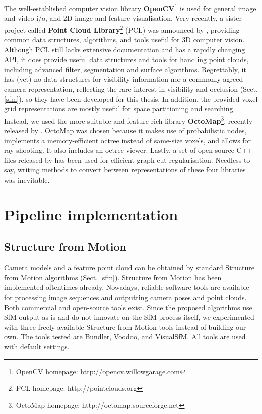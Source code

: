 The well-established computer vision library \textbf{OpenCV}\footnote{OpenCV homepage: http://opencv.willowgarage.com} \OpenCV is used for general image and video i/o, and 2D image and feature visualisation. Very recently, a sister project called \textbf{Point Cloud Library}\footnote{PCL homepage: http://pointclouds.org} (PCL) was announced by , providing common data structures, algorithms, and tools useful for 3D computer vision. Although PCL still lacks extensive documentation and has a rapidly changing API, it does provide useful data structures and tools for handling point clouds, including advanced filter, segmentation and surface algorithms. Regrettably, it has (yet) no data structures for visibility information nor a commonly-agreed camera representation, reflecting the rare interest in visibility and occlusion (Sect. \ref{sfm}), so they have been developed for this thesis. In addition, the provided voxel grid representations are mostly useful for space partitioning and searching. Instead, we used the more suitable and feature-rich library \textbf{OctoMap}\footnote{OctoMap homepage: http://octomap.sourceforge.net}, recently released by . OctoMap was chosen because it makes use of probabilistic nodes, implements a memory-efficient octree instead of same-size voxels, and allows for ray shooting. It also includes an octree viewer. Lastly, a set of open-source C++ files released by  has been used for efficient graph-cut regularisation. Needless to say, writing methods to convert between representations of these four libraries was inevitable.


\section{Pipeline implementation}  \label{pipeline-implementation}

\subsection{Structure from Motion}
Camera models and a feature point cloud can be obtained by standard Structure from Motion algorithms (Sect. \ref{sfm}). Structure from Motion has been implemented oftentimes already. Nowadays, reliable software tools are available for processing image sequences and outputting camera poses and point clouds. Both commercial and open-source tools exist. Since the proposed algorithms use SfM output as is and do not innovate on the SfM process itself, we experimented with three freely available Structure from Motion tools instead of building our own. The tools tested are Bundler, Voodoo, and VisualSfM. All tools are used with default settings.

